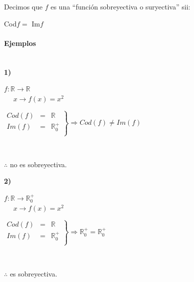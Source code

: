 Decimos que $f$ es una ``función sobreyectiva o suryectiva'' sii:
\begin{center}
Cod$f = $ Im$f$
\end{center}

\paragraph{Ejemplos}
\qquad \\

\qquad \textbf{1)} 

\hfill
\begin{minipage}{.45\textwidth}
\begin{center}
$f: \mathbb{R} \longrightarrow \mathbb{R}$\\
$ $ \qquad $ $ \qquad $ $ \qquad $ $ \qquad $ x \longrightarrow f(x) = x^2$\\
\end{center}
\end{minipage}
\hfill
\begin{minipage}{.45\textwidth}
$\left.
\begin{array}{ccc}
Cod(f)&=& \mathbb{R}\\
Im(f) &=& \mathbb{R} _0 ^+\\
\end{array}\right\} \Rightarrow
 Cod(f) \neq Im(f)$\\
\end{minipage}
\hfill\\
\begin{center}
$\therefore$ no es sobreyectiva.
\end{center}

\qquad \textbf{2)} \\


\hfill
\begin{minipage}{.45\textwidth}
\begin{center}
$f: \mathbb{R} \longrightarrow \mathbb{R} _0 ^+$\\
$ $ \qquad $ $ \qquad $ $ \qquad $ $ \qquad $ x \longrightarrow f(x) = x^2$\\
\end{center}
\end{minipage}
\hfill
\begin{minipage}{.45\textwidth}
$\left.
\begin{array}{ccc}
Cod(f)&=& \mathbb{R}\\
Im(f) &=& \mathbb{R} _0 ^+\\
\end{array}\right\} \Rightarrow
 \mathbb{R} _0 ^+ = \mathbb{R} _0 ^+$\\
\end{minipage}
\hfill\\
\begin{center}
$\therefore$ es sobreyectiva.
\end{center}

